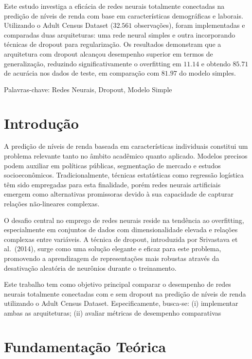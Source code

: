 \documentclass[
  oneclumn]{article}
\begin{document}
Este estudo investiga a eficácia de redes neurais totalmente conectadas
na predição de níveis de renda com base em características demográficas
e laborais. Utilizando o Adult Census Dataset (\(32.561\) observações),
foram implementadas e comparadas duas arquiteturas: uma rede neural
simples e outra incorporando técnicas de dropout para regularização. Os
resultados demonstram que a arquitetura com dropout alcançou desempenho
superior em termos de generalização, reduzindo significativamente o
overfitting em \(11.14%
\) e obtendo \(85.71%
\) de acurácia nos dados de teste, em comparação com \(81.97%
\) do modelo simples.

Palavras-chave: Redes Neurais, Dropout, Modelo Simple

\section{Introdução}\label{introduuxe7uxe3o}

A predição de níveis de renda baseada em características individuais
constitui um problema relevante tanto no âmbito acadêmico quanto
aplicado. Modelos precisos podem auxiliar em políticas públicas,
segmentação de mercado e estudos socioeconômicos. Tradicionalmente,
técnicas estatísticas como regressão logística têm sido empregadas para
esta finalidade, porém redes neurais artificiais emergem como
alternativas promissoras devido à sua capacidade de capturar relações
não-lineares complexas.

O desafio central no emprego de redes neurais reside na tendência ao
overfitting, especialmente em conjuntos de dados com dimensionalidade
elevada e relações complexas entre variáveis. A técnica de dropout,
introduzida por Srivastava et al.~(2014), surge como uma solução
elegante e eficaz para este problema, promovendo a aprendizagem de
representações mais robustas através da desativação aleatória de
neurônios durante o treinamento.

Este trabalho tem como objetivo principal comparar o desempenho de redes
neurais totalmente conectadas com e sem dropout na predição de níveis de
renda utilizando o Adult Census Dataset. Especificamente, busca-se: (i)
implementar ambas as arquiteturas; (ii) avaliar métricas de desempenho
comparativas

\section{Fundamentação Teórica}\label{fundamentauxe7uxe3o-teuxf3rica}
\end{document}
